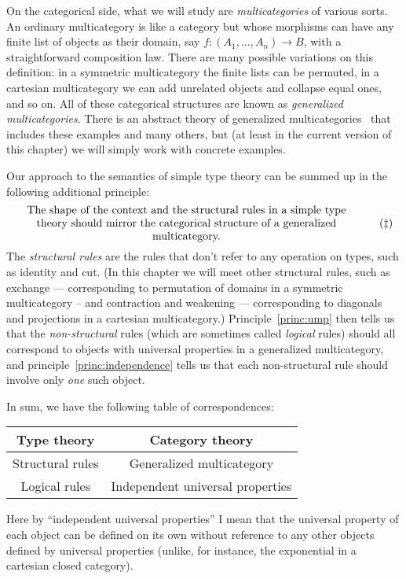 On the categorical side, what we will study are \emph{multicategories} of various sorts.
An ordinary multicategory is like a category but whose morphisms can have any finite list of objects as their domain, say $f:(A_1,\dots,A_n) \to B$, with a straightforward composition law.
There are many possible variations on this definition: in a symmetric multicategory the finite lists can be permuted, in a cartesian multicategory we can add unrelated objects and collapse equal ones, and so on.
All of these categorical structures are known as \emph{generalized multicategories}.
There is an abstract theory of generalized multicategories~\cite{cs:multicats,hermida:coh-univ,leinster:higher-opds,burroni:t-cats} that includes these examples and many others, but (at least in the current version of this chapter) we will simply work with concrete examples.

Our approach to the semantics of simple type theory can be summed up in the following additional principle:
\begin{equation}\label{princ:structural}
  \parbox{4.3in}{\centering The shape of the context and the structural rules in a simple type theory should mirror the categorical structure of a generalized multicategory.}\tag{$\ddagger$}
\end{equation}
The \emph{structural rules} are the rules that don't refer to any operation on types, such as identity and cut.
(In this chapter we will meet other structural rules, such as exchange --- corresponding to permutation of domains in a symmetric multicategory -- and contraction and weakening --- corresponding to diagonals and projections in a cartesian multicategory.)
Principle~\eqref{princ:ump} then tells us that the \emph{non-structural} rules (which are sometimes called \emph{logical} rules) should all correspond to objects with universal properties in a generalized multicategory, and principle~\eqref{princ:independence} tells us that each non-structural rule should involve only \emph{one} such object.

In sum, we have the following table of correspondences:
\begin{center}
  \begin{tabular}{c|c}
    Type theory & Category theory\\\hline
    Structural rules & Generalized multicategory\\
    Logical rules & Independent universal properties
  \end{tabular}
\end{center}
Here by ``independent universal properties'' I mean that the universal property of each object can be defined on its own without reference to any other objects defined by universal properties (unlike, for instance, the exponential in a cartesian closed category).

